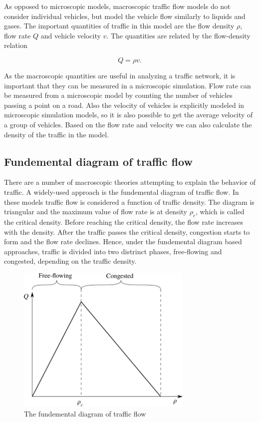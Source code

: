 \documentclass[english, 12pt, a4paper, elec, utf8, pdfa, online]{aaltothesis}
\begin{document}
As opposed to microscopic models, macroscopic traffic flow models do not consider individual vehicles, but model the vehicle flow similarly to liquids and gases. The important quantities of traffic in this model are the flow density $\rho$, flow rate $Q$ and vehicle velocity $v$. The quantities are related by the flow-density relation

\[ Q = \rho v .\]

As the macroscopic quantities are useful in analyzing a traffic network, it is important that they can be measured in a microscopic simulation. Flow rate can be measured from a microscopic model by counting the number of vehicles passing a point on a road. Also the velocity of vehicles is explicitly modeled in microscopic simulation models, so it is also possible to get the average velocity of a group of vehicles. Based on the flow rate and velocity we can also calculate the density of the traffic in the model. \cite{treiber}

\subsection{Fundemental diagram of traffic flow}

There are a number of macroscopic theories attempting to explain the behavior of traffic. A widely-used approach is the fundemental diagram of traffic flow. In these models traffic flow is considered a function of traffic density. The diagram is triangular and the maximum value of flow rate is at density $\rho_c$, which is called the critical density. Before reaching the critical density, the flow rate increases with the density. After the traffic passes the critical density, congestion starts to form and the flow rate declines. Hence, under the fundemental diagram based approaches, traffic is divided into two distrinct phases, free-flowing and congested, depending on the traffic density. \cite {lighthillwhitham}

\begin{figure}[h]
    \centering
    \includegraphics[width=0.75\textwidth]{graphs/fund_diagram}
    \caption{The fundemental diagram of traffic flow}
\end{figure}
\end{document}
